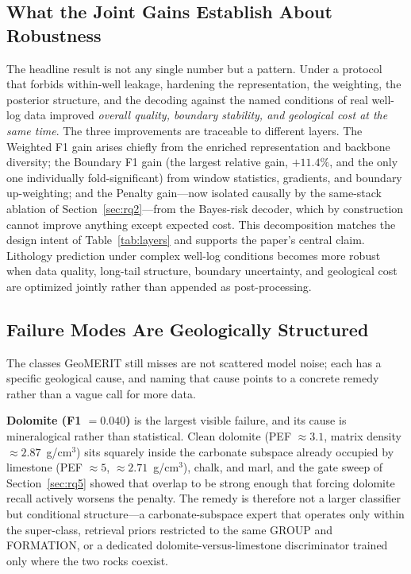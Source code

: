 \documentclass[bdcc,article,submit,pdftex,moreauthors]{Definitions/mdpi}
\begin{document}
\subsection{What the Joint Gains Establish About Robustness}
\label{sec:joint}
The headline result is not any single number but a pattern. Under a protocol that forbids
within-well leakage, hardening the representation, the weighting, the posterior structure,
and the decoding against the named conditions of real well-log data improved \emph{overall
quality, boundary stability, and geological cost at the same time}. The three improvements are
traceable to different layers. The Weighted F1 gain arises chiefly from the
enriched representation and backbone diversity; the Boundary F1 gain (the largest relative
gain, $+11.4\%$, and the only one individually fold-significant) from window statistics,
gradients, and boundary up-weighting; and the Penalty gain---now isolated causally by the
same-stack ablation of Section~\ref{sec:rq2}---from the Bayes-risk decoder, which by
construction cannot improve anything except expected cost. This decomposition matches the
design intent of Table~\ref{tab:layers} and supports the paper's central claim. Lithology
prediction under complex well-log conditions becomes more robust when data quality,
long-tail structure, boundary uncertainty, and geological cost are optimized jointly rather
than appended as post-processing.

\subsection{Failure Modes Are Geologically Structured}
\label{sec:failures}
The classes GeoMERIT still misses are not scattered model noise; each has a specific geological
cause, and naming that cause points to a concrete remedy rather than a vague call for more data.

\textbf{Dolomite (F1 $=0.040$)} is the largest visible failure, and its cause is mineralogical
rather than statistical. Clean dolomite (PEF $\approx 3.1$, matrix density
$\approx 2.87$~g/cm$^3$) sits squarely inside the carbonate subspace already occupied by
limestone (PEF $\approx 5$, $\approx 2.71$~g/cm$^3$), chalk, and marl, and the gate sweep of
Section~\ref{sec:rq5} showed that overlap to be strong enough that forcing dolomite recall
actively worsens the penalty. The remedy is therefore not a larger classifier but conditional
structure---a carbonate-subspace expert that operates only within the super-class, retrieval
priors restricted to the same GROUP and FORMATION, or a dedicated dolomite-versus-limestone
discriminator trained only where the two rocks coexist.
\end{document}
